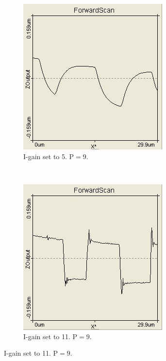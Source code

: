 \documentclass[paper=a4,fontsize=10pt,DIV=18,twocolumn,parskip=half]{scrartcl}
\numberwithin{equation}{section}    %
\begin{document}
\begin{figure}
    \centering
    \begin{subfigure}{0.45\columnwidth}
         \includegraphics[width=\textwidth]{Bilder/wenigI}
        \caption{I-gain set to 5. $\mathrm{P}=9$. }
        \label{wenigI}
    \end{subfigure}
    ~
    \begin{subfigure}{0.45\columnwidth}
        \includegraphics[width=\textwidth]{Bilder/vielI}
        \caption{I-gain set to 11. 
        $\mathrm{P}=9$.}
        \label{vielI}
    \end{subfigure}
     

\end{figure}
\end{document}
